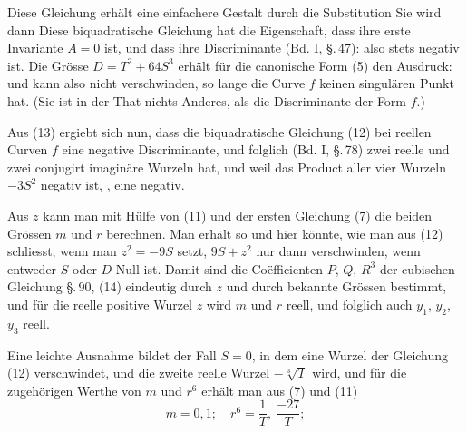 
Diese Gleichung erhält eine einfachere Gestalt durch die
Substitution
Sie wird dann
Diese biquadratische Gleichung hat die Eigenschaft, dass
ihre erste Invariante $A=0$ ist, und dass ihre Discriminante
(Bd. I, \S.\,47):
also stets negativ ist. Die Grösse $D=T^2+64S^3$ erhält für
die canonische Form (5) den Ausdruck:
und kann also nicht verschwinden, so lange die Curve $f$ keinen
singulären Punkt hat. (Sie ist in der That nichts Anderes, als
die Discriminante der Form $f$.)

Aus (13) ergiebt sich nun, dass die biquadratische Gleichung
 (12) bei reellen Curven $f$ eine negative Discriminante, und
folglich (Bd. I, \S.\,78) zwei reelle und zwei conjugirt imaginäre
Wurzeln hat, und weil das Product aller vier Wurzeln $-3S^2$
negativ ist, ,
eine negativ.

Aus $z$ kann man mit Hülfe von (11) und der ersten Gleichung
 (7) die beiden Grössen $m$ und $r$ berechnen. Man erhält so
und hier könnte, wie man aus (12) schliesst, wenn man
$z^2=-9S$ setzt, $9S+z^2$ nur dann verschwinden, wenn entweder
 $S$ oder $D$ Null ist. Damit sind die Co\"efficienten $P$, $Q$, $R^3$
der cubischen Gleichung \S.\,90, (14) eindeutig durch $z$ und durch
bekannte Grössen bestimmt, und für die reelle positive Wurzel $z$
wird $m$ und $r$ reell, und folglich auch $y_1$, $y_2$, $y_3$ reell.

Eine leichte Ausnahme bildet der Fall $S=0$, in dem eine
Wurzel der Gleichung (12) verschwindet, und die zweite reelle
Wurzel $-\sqrt[3]{T}$ wird, und für die zugehörigen Werthe von $m$
und $r^6$ erhält man aus (7) und (11)
\[
m = 0, 1; \quad r^6 = \frac{1}{T}, \ \frac{-27}{T};
\]
